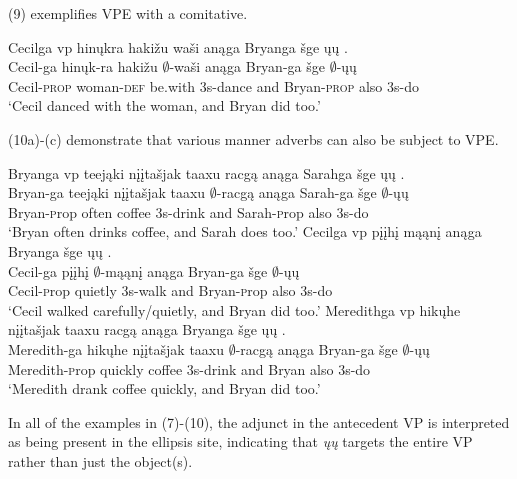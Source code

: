 \documentclass[output=paper]{LSP/langsci}
\begin{document}
(9) exemplifies VPE with a comitative.

\begin{exe}
\ex
\glll Cecilga {\ob}{vp} hinųkra hakižu waši{\cb} anąga Bryanga šge {\ob}ųų{\cb} .\\
Cecil-ga {} hinųk-ra hakižu $\emptyset$-waši anąga Bryan-ga šge $\emptyset$-ųų\\
Cecil-\textsc{prop} {} woman-\textsc{def} be.with {\textsc 3s}-dance and Bryan-\textsc{prop} also {\textsc 3s}-do\\
\trans `Cecil danced with the woman, and Bryan did too.'
\end{exe}

(10a)-(c) demonstrate that various manner adverbs can also be subject to VPE.

\begin{exe}
\ex
\begin{xlist}
\ex
\glll Bryanga  {\ob}{vp} teejąki {nįįtašjak taaxu} racgą{\cb} anąga Sarahga šge {\ob}ųų{\cb} .\\ 
Bryan-ga {} teejąki {nįįtašjak taaxu} $\emptyset$-racgą anąga Sarah-ga šge $\emptyset$-ųų\\
Bryan-{\textsc prop} {} often coffee {\textsc 3s}-drink and Sarah-{\textsc prop} also {\textsc 3s}-do\\
\trans `Bryan often drinks coffee, and Sarah does too.'
\ex
\glll Cecilga  {\ob}{vp} pįįhį mąąnį{\cb} anąga Bryanga šge {\ob}ųų{\cb} .\\
Cecil-ga {} pįįhį $\emptyset$-mąąnį anąga Bryan-ga šge $\emptyset$-ųų\\
Cecil-{\textsc prop} {} quietly {\textsc 3s}-walk and Bryan-{\textsc prop} also {\textsc 3s}-do\\
\trans `Cecil walked carefully/quietly, and Bryan did too.'
\ex
\glll Meredithga {\ob}{vp} hikųhe {nįįtašjak taaxu} racgą{\cb} anąga Bryanga šge {\ob}ųų{\cb} .\\
Meredith-ga {} hikųhe {nįįtašjak taaxu} $\emptyset$-racgą anąga Bryan-ga šge $\emptyset$-ųų\\
Meredith-{\textsc prop} {} quickly coffee {\textsc 3s}-drink and Bryan also {\textsc 3s}-do\\
\trans `Meredith drank coffee quickly, and Bryan did too.'
\end{xlist}
\end{exe}

In all of the examples in (7)-(10), the adjunct in the antecedent VP is interpreted as being present in the ellipsis site, indicating that \emph{ųų} targets the entire VP rather than just the object(s).
\end{document}
